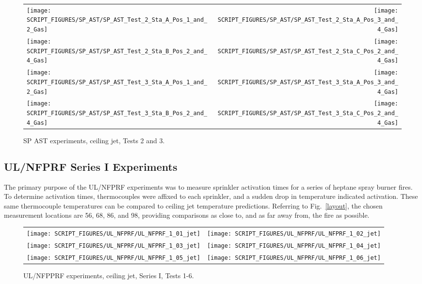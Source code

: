 \begin{figure}[p]
\begin{tabular*}{\textwidth}{l@{\extracolsep{\fill}}r}
\texttt{[image: SCRIPT\_FIGURES/SP\_AST/SP\_AST\_Test\_2\_Sta\_A\_Pos\_1\_and\_2\_Gas]} &
\texttt{[image: SCRIPT\_FIGURES/SP\_AST/SP\_AST\_Test\_2\_Sta\_A\_Pos\_3\_and\_4\_Gas]} \\
\texttt{[image: SCRIPT\_FIGURES/SP\_AST/SP\_AST\_Test\_2\_Sta\_B\_Pos\_2\_and\_4\_Gas]} &
\texttt{[image: SCRIPT\_FIGURES/SP\_AST/SP\_AST\_Test\_2\_Sta\_C\_Pos\_2\_and\_4\_Gas]} \\
\texttt{[image: SCRIPT\_FIGURES/SP\_AST/SP\_AST\_Test\_3\_Sta\_A\_Pos\_1\_and\_2\_Gas]} &
\texttt{[image: SCRIPT\_FIGURES/SP\_AST/SP\_AST\_Test\_3\_Sta\_A\_Pos\_3\_and\_4\_Gas]} \\
\texttt{[image: SCRIPT\_FIGURES/SP\_AST/SP\_AST\_Test\_3\_Sta\_B\_Pos\_2\_and\_4\_Gas]} &
\texttt{[image: SCRIPT\_FIGURES/SP\_AST/SP\_AST\_Test\_3\_Sta\_C\_Pos\_2\_and\_4\_Gas]}
\end{tabular*}
\caption{SP AST experiments, ceiling jet, Tests 2 and 3.}
\label{SP_Test_2_3_Gas}
\end{figure}


\clearpage

\subsection{UL/NFPRF Series I Experiments}

The primary purpose of the UL/NFPRF experiments was to measure sprinkler activation times for a series of heptane spray burner fires. To determine activation times, thermocouples were affixed to each sprinkler, and a sudden drop in temperature indicated activation. These same thermocouple temperatures can be compared to ceiling jet temperature predictions. Referring to Fig.~\ref{layout}, the chosen measurement locations are 56, 68, 86, and 98, providing comparisons as close to, and as far away from, the fire as possible.


\begin{figure}[h!]
\begin{tabular*}{\textwidth}{l@{\extracolsep{\fill}}r}
\texttt{[image: SCRIPT\_FIGURES/UL\_NFPRF/UL\_NFPRF\_1\_01\_jet]} &
\texttt{[image: SCRIPT\_FIGURES/UL\_NFPRF/UL\_NFPRF\_1\_02\_jet]} \\
\texttt{[image: SCRIPT\_FIGURES/UL\_NFPRF/UL\_NFPRF\_1\_03\_jet]} &
\texttt{[image: SCRIPT\_FIGURES/UL\_NFPRF/UL\_NFPRF\_1\_04\_jet]} \\
\texttt{[image: SCRIPT\_FIGURES/UL\_NFPRF/UL\_NFPRF\_1\_05\_jet]} &
\texttt{[image: SCRIPT\_FIGURES/UL\_NFPRF/UL\_NFPRF\_1\_06\_jet]}
\end{tabular*}
\caption{UL/NFPPRF experiments, ceiling jet, Series I, Tests 1-6.}
\label{UL_NFPRF_jet_1}
\end{figure}

